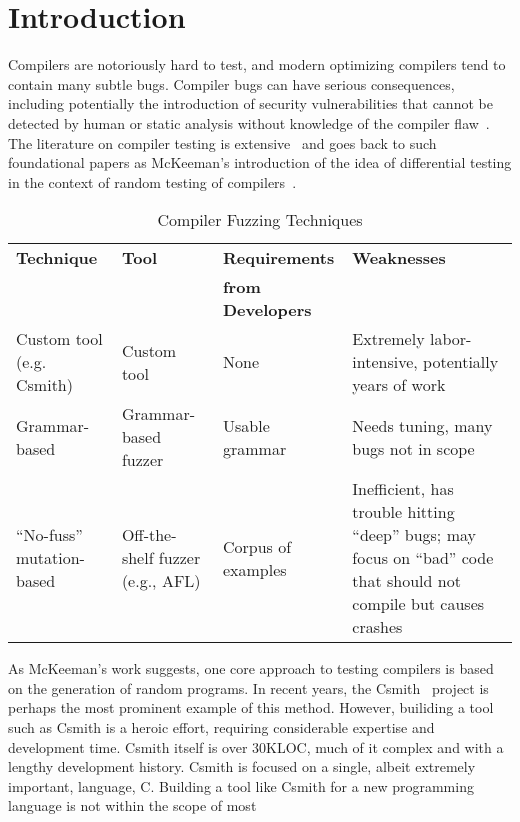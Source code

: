 \section{Introduction}

Compilers are notoriously hard to test, and modern optimizing
compilers tend to contain many subtle bugs.  Compiler bugs can have
serious consequences, including potentially the introduction of
security vulnerabilities that cannot be detected by human or static
analysis without knowledge of the compiler flaw~\cite{CompBug}.   The
literature on compiler testing is extensive~\cite{chen2020survey} and
goes back to such foundational papers as McKeeman's introduction of
the idea of differential testing in the context of random testing of
compilers~\cite{Differential}.

\begin{table*}
\centering
\begin{tabular}{p{45mm}p{30mm}p{30mm}p{45mm}}
\toprule
\bf Technique & \bf Tool & \bf Requirements    & \bf Weaknesses \\
              &          & \bf from Developers &                \\
\rowcolor{LLGray}
Custom tool (e.g. Csmith)  
& Custom tool 
& None 
& Extremely labor-intensive, potentially years of work
\\
Grammar-based              
& Grammar-based fuzzer             
& Usable grammar 
& Needs tuning, many bugs not in scope 
\\
\rowcolor{LLGray}
``No-fuss'' mutation-based 
& Off-the-shelf fuzzer (e.g., AFL) 
& Corpus of examples 
& Inefficient, has trouble hitting ``deep'' bugs; may focus on ``bad'' code that should not compile but causes crashes 
\\
\bottomrule
\end{tabular}
\caption{Compiler Fuzzing Techniques}
\label{tab:techniques}
\end{table*}
As McKeeman's work suggests, one core approach to testing compilers is
based on
the generation of random programs.  In recent
years, the Csmith~\cite{csmith} project is perhaps the most prominent
example of this method.  However, builiding a tool such as Csmith
is a heroic effort, requiring considerable expertise and
development time.  Csmith itself is over 30KLOC, much of it complex
and with a lengthy development history.  Csmith is focused on a
single, albeit extremely important, language, C.  Building a tool like
Csmith for a new programming language is not within the scope of most
